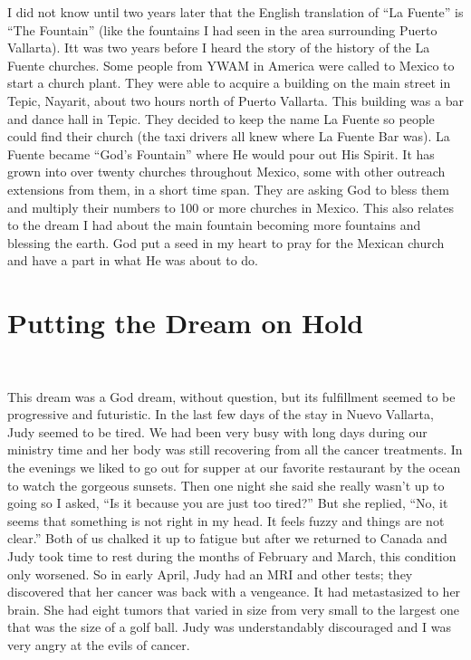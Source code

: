 \documentclass[twoside, 12pt]{book}
\begin{document}
I did not know until two years later that the English translation of “La Fuente” is “The Fountain” (like the fountains I had seen in the area surrounding Puerto Vallarta). Itt was two years before I heard the story of the history of the La Fuente churches. Some people from YWAM in America were called to Mexico to start a church plant. They were able to acquire a building on the main street in Tepic, Nayarit, about two hours north of Puerto Vallarta. This building was a bar and dance hall in Tepic. They decided to keep the name La Fuente so people could find their church (the taxi drivers all knew where La Fuente Bar was). La Fuente became “God’s Fountain” where He would pour out His Spirit. It has grown into over twenty churches throughout Mexico, some with other outreach extensions from them, in a short time span. They are asking God to bless them and multiply their numbers to 100 or more churches in Mexico. This also relates to the dream I had about the main fountain becoming more fountains and blessing the earth. God put a seed in my heart to pray for the Mexican church and have a part in what He was about to do.



\section{Putting the Dream on Hold}
\

This dream was a God dream, without question, but its fulfillment seemed to be progressive and futuristic. In the last few days of the stay in Nuevo Vallarta, Judy seemed to be tired. We had been very busy with long days during our ministry time and her body was still recovering from all the cancer treatments. In the evenings we liked to go out for supper at our favorite restaurant by the ocean to watch the gorgeous sunsets. Then one night she said she really wasn’t up to going so I asked, “Is it because you are just too tired?” But she replied, “No, it seems that something is not right in my head. It feels fuzzy and things are not clear.” Both of us chalked it up to fatigue but after we returned to Canada and Judy took time to rest during the months of February and March, this condition only worsened. So in early April, Judy had an MRI and other tests; they discovered that her cancer was back with a vengeance. It had metastasized to her brain. She had eight tumors that varied in size from very small to the largest one that was the size of a golf ball. Judy was understandably discouraged and I was very angry at the evils of cancer. 
\end{document}
